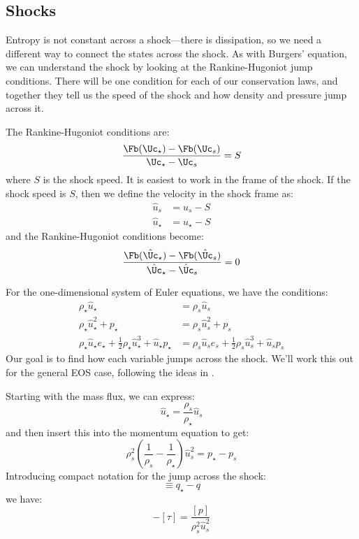\subsection{Shocks}

Entropy is not constant across a shock---there is dissipation, so we
need a different way to connect the states across the shock.  As with
Burgers' equation, we can understand the shock by looking at the
Rankine-Hugoniot jump conditions.  There will be one condition for
each of our conservation laws, and together they tell us the speed of
the shock and how density and pressure jump across
it.

The Rankine-Hugoniot conditions are:
\begin{equation}
\frac{\Fb(\Uc_\star) - \Fb(\Uc_s)}{\Uc_\star - \Uc_s} = S
\end{equation}
where $S$ is the shock speed.  It is easiest to work in the frame of the shock.  If the shock speed
is $S$, then we define the velocity in the shock frame as:
\begin{align}
\hat{u}_s &= u_s - S  \\
\hat{u}_\star &= u_\star - S
\end{align}
and the Rankine-Hugoniot conditions become:
\begin{equation}
\frac{\Fb(\hat{\Uc}_\star) - \Fb(\hat{\Uc}_s)}{\hat{\Uc}_\star - \hat{\Uc}_s} = 0
\end{equation}

For the one-dimensional system of Euler equations, we have the conditions:
\begin{align}
\rho_\star \hat{u}_\star &= \rho_s \hat{u}_s \\
\rho_\star \hat{u}_\star^2 + p_\star &= \rho_s \hat{u}_s^2 + p_s \\
\rho_\star \hat{u}_\star e_\star + \frac{1}{2} \rho_\star \hat{u}_\star^3 + \hat{u}_\star p_\star &=
  \rho_s \hat{u}_s e_s + \frac{1}{2} \rho_s \hat{u}_s^3 + \hat{u}_s p_s
\end{align}
Our goal is to find how each variable jumps across the shock.  We'll
work this out for the general EOS case, following the ideas in \cite{colellaglaz:1985}.

Starting with the mass flux, we can express:
\begin{equation}
\hat{u}_\star = \frac{\rho_s}{\rho_\star} \hat{u}_s
\end{equation}
and then insert this into the momentum equation to get:
\begin{equation}
\rho_s^2 \left ( \frac{1}{\rho_s} - \frac{1}{\rho_\star} \right ) \hat{u}_s^2 = p_\star - p_s
\end{equation}
Introducing compact notation for the jump across the shock:
\begin{equation}
[q] \equiv q_\star - q
\end{equation}
we have:
\begin{equation}
-[\tau] = \frac{[p]}{\rho_s^2 \hat{u}_s^2}
\end{equation}

